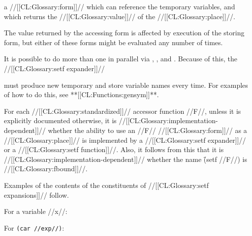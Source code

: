 
a //[[CL:Glossary:form]]// which can reference the temporary variables,
and which returns the //[[CL:Glossary:value]]// of the //[[CL:Glossary:place]]//.
\endlist


The value returned by the accessing form is
affected by execution of the storing form, but either of these
forms might be evaluated any number of times.







It is possible
to do more than one  in parallel via
, , and .  
Because of this, the 
//[[CL:Glossary:setf expander]]//

must produce new temporary 
and store variable names every time.  For examples of how to do this,
see **[[CL:Functions:gensym]]**.


For each //[[CL:Glossary:standardized]]// accessor function //F//,
unless it is explicitly documented otherwise,
it is //[[CL:Glossary:implementation-dependent]]// whether the ability to 
use an //F// //[[CL:Glossary:form]]// as a  //[[CL:Glossary:place]]//
is implemented by a //[[CL:Glossary:setf expander]]// or a //[[CL:Glossary:setf function]]//.
Also, it follows from this that it is //[[CL:Glossary:implementation-dependent]]// 
whether the name \f{(setf //F//)} is //[[CL:Glossary:fbound]]//.



Examples of the contents of the constituents of //[[CL:Glossary:setf expansions]]//
follow.


For a variable //x//:



For {\tt (car //exp//)}:



